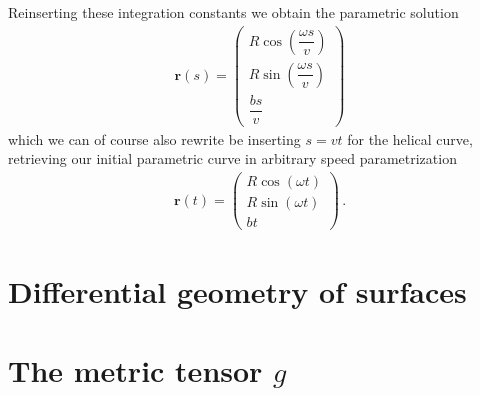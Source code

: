 \documentclass[11pt, DINA4, fleqn]{amsart}
\def\vr{\boldsymbol{r}\xspace}
\begin{document}
Reinserting these integration constants we obtain the parametric solution
\begin{align}
\vr(s) = \begin{pmatrix}
R\cos\left(\dfrac{\omega s}{v}\right) \\
R\sin\left(\dfrac{\omega s}{v}\right) \\
\dfrac{bs}{v}
\end{pmatrix}
\end{align}
which we can of course also rewrite be inserting $s = vt$ for the helical curve,
retrieving our initial parametric curve in arbitrary speed parametrization
\begin{align}
\vr(t) = \begin{pmatrix}
R\cos\left(\omega t\right) \\
R\sin\left(\omega t\right) \\
bt
\end{pmatrix} \, .
\end{align}

\section{Differential geometry of surfaces}

\section{The metric tensor $g$}
\end{document}
